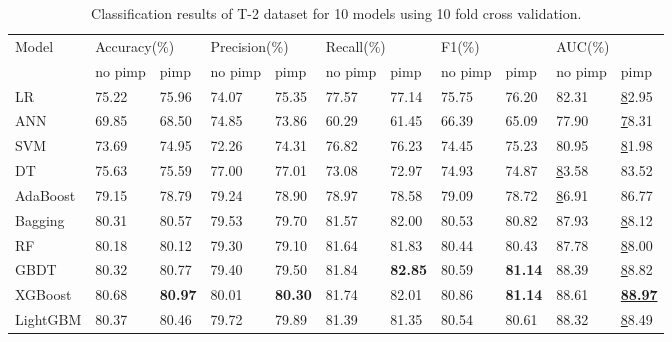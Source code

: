 \documentclass[review]{elsarticle}
\begin{document}
\begin{table}[H]
    \centering
    \caption{Classification results of T-2 dataset for 10 models using 10 fold cross validation.}
    \label{Classification results 2}
    \begin{tabular}{lllllllllll}
    \hline
    \multirow{2}{*}{Model} & \multicolumn{2}{l}{Accuracy(\%)} & \multicolumn{2}{l}{Precision(\%)} & \multicolumn{2}{l}{Recall(\%)} & \multicolumn{2}{l}{F1(\%)} & \multicolumn{2}{l}{AUC(\%)} \\ \cline{2-11}
     & no pimp & pimp & no pimp & pimp & no pimp & pimp & no pimp & pimp & no pimp & pimp \\ \hline
    LR & 75.22 & 75.96 & 74.07 & 75.35 & 77.57 & 77.14 & 75.75 & 76.20 & 82.31 & {\ul 82.95} \\
    ANN & 69.85 & 68.50 & 74.85 & 73.86 & 60.29 & 61.45 & 66.39 & 65.09 & 77.90 & {\ul 78.31} \\
    SVM & 73.69 & 74.95 & 72.26 & 74.31 & 76.82 & 76.23 & 74.45 & 75.23 & 80.95 & {\ul 81.98} \\
    DT & 75.63 & 75.59 & 77.00 & 77.01 & 73.08 & 72.97 & 74.93 & 74.87 & {\ul 83.58} & 83.52 \\
    AdaBoost & 79.15 & 78.79 & 79.24 & 78.90 & 78.97 & 78.58 & 79.09 & 78.72 & {\ul 86.91} & 86.77 \\
    Bagging & 80.31 & 80.57 & 79.53 & 79.70 & 81.57 & 82.00 & 80.53 & 80.82 & 87.93 & {\ul 88.12} \\
    RF & 80.18 & 80.12 & 79.30 & 79.10 & 81.64 & 81.83 & 80.44 & 80.43 & 87.78 & {\ul 88.00} \\
    GBDT & 80.32 & 80.77 & 79.40 & 79.50 & 81.84 & \textbf{82.85} & 80.59 & \textbf{81.14} & 88.39 & {\ul 88.82} \\
    XGBoost & 80.68 & \textbf{80.97} & 80.01 & \textbf{80.30} & 81.74 & 82.01 & 80.86 & \textbf{81.14} & 88.61 & {\ul \textbf{88.97}} \\
    LightGBM & 80.37 & 80.46 & 79.72 & 79.89 & 81.39 & 81.35 & 80.54 & 80.61 & 88.32 & {\ul 88.49} \\ \hline
    \end{tabular}
\end{table}
\end{document}
